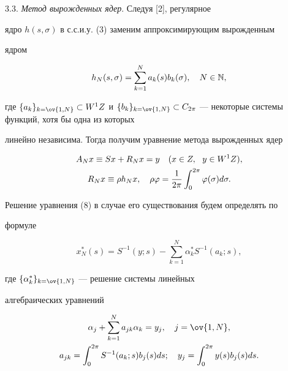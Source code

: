  


3.3. {\it Метод вырожденных ядер}. Следуя [2], регулярное 


ядро $h(s,\sigma)$ в с.с.и.у. (3) заменим аппроксимирующим вырожденным 


ядром 


$$ 


h_N(s,\sigma)=\sum^N_{k=1}a_k(s)b_k(\sigma),\quad N\in \Bbb N, 


$$ 


где $\{a_k\}_{k=\ov{1,N}}\subset W^1Z$ и $\{b_k\}_{k=\ov{1,N}}\subset 


C_{2\pi}$ --- некоторые системы функций, хотя бы одна из которых 


линейно независима. Тогда получим уравнение метода вырожденных ядер 


\begin{gather} 


A_N x\equiv S x+R_N x=y\quad (x\in Z,\ \ y\in W^1Z), \\ 


R_N x\equiv\rho h_N x,\quad 


\rho\varphi=\frac{1}{2\pi}\int^{2\pi}_0 


\varphi(\sigma)d\sigma.\notag 


\end{gather} 


Решение уравнения (8) в случае его существования будем определять по 


формуле 


\begin{equation} 


x^*_N(s)=S^{-1}(y;s)-\sum^N_{k=1}\alpha^*_k 


S^{-1}(a_k;s), 


\end{equation} 


где $\{\alpha^*_k\}_{k=\ov{1,N}}$ --- решение системы линейных 


алгебраических уравнений 


\begin{gather} 


\alpha_j+\sum^N_{k=1}a_{jk}\alpha_k=y_j,\quad j=\ov{1,N}, \\ 


a_{jk}=\int^{2\pi}_0 S^{-1}(a_k;s)b_j(s)d s;\quad 


y_j=\int^{2\pi}_0 y(s)b_j(s)d s.\notag 


\end{gather} 


